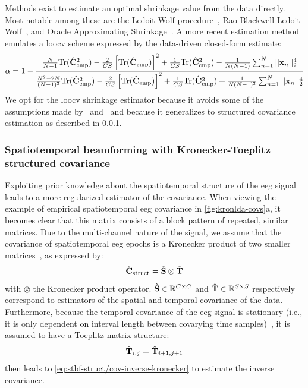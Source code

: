 	Methods exist to estimate an optimal shrinkage value from the data directly.
	Most notable among these are the Ledoit-Wolf procedure~\cite{Ledoit2004},
	Rao-Blackwell Ledoit-Wolf~\cite{Chen2010}, and Oracle Approximating Shrinkage~\cite{Chen2010}.
  A more recent estimation method~\cite{Tong2018} emulates a \ac{loocv} scheme expressed by the data-driven closed-form
	estimate:
	\begin{equation}
		\alpha =
		1-\frac{
      \frac{N}{N-1}\text{Tr}(\hat{\mathbf{C}}_\text{emp}^2)
      - \frac{2}{CS}\left[\text{Tr}(\hat{\mathbf{C}}_\text{emp})\right]^2
      + \frac{1}{CS}\text{Tr}(\hat{\mathbf{C}}_\text{emp}^2)
			- \frac{1}{N(N-1)}\sum_{n=1}^N||\mathbf{x}_n||_2^4
		}
		{
      \frac{N^2 -2N}{(N-1)^2}\text{Tr}(\hat{\mathbf{C}}_\text{emp}^2)
      - \frac{2}{CS}\left[\text{Tr}(\hat{\mathbf{C}}_\text{emp})\right]^2
      + \frac{1}{CS}\text{Tr}(\hat{\mathbf{C}}_\text{emp}^2)
			+ \frac{1}{N(N-1)^2}\sum_{n=1}^N||\mathbf{x}_n||_2^4
		}
		\label{eq:loocv}
	\end{equation}
	We opt for the \ac{loocv} shrinkage estimator because it avoids some of the
	assumptions made by~\cite{Ledoit2004} and~\cite{Chen2010} and
	because it generalizes to structured covariance estimation as described in
	\cref{sec:stbf-struct/methods/structured-estimation}.

	\subsubsection{Spatiotemporal beamforming with Kronecker-Toeplitz structured covariance}
	\label{sec:stbf-struct/methods/structured-estimation}
	Exploiting prior knowledge about the spatiotemporal structure of the \ac{eeg} signal leads to a more regularized estimator of the covariance.
	When viewing the example of empirical spatiotemporal \ac{eeg} covariance in
	\cref{fig:kronlda-covs}a, it becomes clear that this matrix consists of a block pattern of repeated, similar matrices.
	Due to the multi-channel nature of the signal, we assume that the covariance of spatiotemporal \ac{eeg} epochs is a Kronecker
	product of two smaller
	matrices~\cite{Munck1992,DeMunck1999,Huizenga2002}, as expressed
	by:
	\begin{equation}
    \hat{\mathbf{C}}_\text{struct} = \hat{\mathbf{S}} \otimes \hat{\mathbf{T}}
		\label{eq:kronecker}
	\end{equation}
	with $\otimes$ the Kronecker product operator.
  $\hat{\mathbf{S}} \in \mathbb{R}^{C\times C}$ and $\hat{\mathbf{T}} \in \mathbb{R}^{S\times S}$ respectively correspond to estimators of the spatial and temporal covariance of the data.
	Furthermore, because the temporal covariance of the \ac{eeg}-signal is
	stationary (i.e., it is only dependent on interval length between covarying
	time samples)~\cite{Bijma2003}, it is assumed to have a Toeplitz-matrix structure:
	\begin{equation}
    \hat{\mathbf{T}}_{i,j} = \hat{\mathbf{T}}_{i+1,j+1}
		\label{eq:toeplitz}
	\end{equation}
	 then leads to
	\cref{eq:stbf-struct/cov-inverse-kronecker} to estimate the inverse
	covariance.

